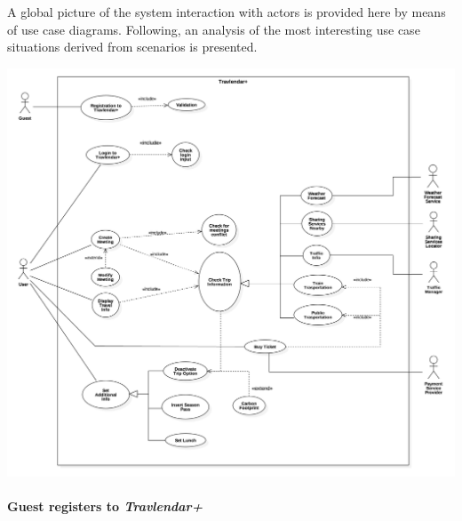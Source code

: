 A global picture of the system interaction with actors is provided here by means of use case diagrams. Following, an analysis of the most interesting use case situations derived from scenarios is presented.

	\includegraphics[width=\textwidth]{img/uml/useCase.png}

	\paragraph{Guest registers to \textit{Travlendar+}}
	
